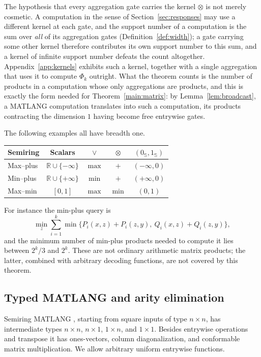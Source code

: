 The hypothesis that every aggregation gate carries the kernel $\otimes$ is
not merely cosmetic. A computation in the sense of
Section~\ref{sec:responses} may use a different kernel at each gate, and the
support number of a computation is the sum over \emph{all} of its
aggregation gates (Definition~\ref{def:width}); a gate carrying some other
kernel therefore contributes its own support number to this sum, and a
kernel of infinite support number defeats the count altogether.
Appendix~\ref{app:kernels} exhibits such a kernel, together with a single
aggregation that uses it to compute $\Phi_k$ outright. What the
theorem counts is the number of products in a computation whose only
aggregations are products, and this is exactly the form needed for
Theorem~\ref{main:matrix}: by Lemma~\ref{lem:broadcast}, a MATLANG
computation translates into such a computation, its products contracting
the dimension $1$ having become free entrywise gates.

The following examples all have breadth one.
\begin{center}
\renewcommand{\arraystretch}{1.2}
\begin{tabular}{lcccc}
\toprule
Semiring & Scalars & $\vee$ & $\otimes$ & $(0_{\mathbb S},1_{\mathbb S})$\\
\midrule
Max--plus & $\mathbb R\cup\{-\infty\}$ & $\max$ & $+$ & $(-\infty,0)$\\
Min--plus & $\mathbb R\cup\{+\infty\}$ & $\min$ & $+$ & $(+\infty,0)$\\
Max--min & $[0,1]$ & $\max$ & $\min$ & $(0,1)$\\
\bottomrule
\end{tabular}
\end{center}
For instance the min-plus query is
\[
 \min_z\sum_{i=1}^k
 \min\{P_i(x,z)+P_i(z,y),\ Q_i(x,z)+Q_i(z,y)\},
\]
and the minimum number of min-plus products needed to compute it lies
between $2^k/3$ and $2^k$. These are not ordinary arithmetic matrix
products; the latter, combined with arbitrary decoding functions, are not
covered by this theorem.

\subsection{Typed MATLANG and arity elimination}\label{semi:typed-section}
Semiring MATLANG \citep{brijder2022}, starting from square inputs of type
$n\times n$, has intermediate types $n\times n$, $n\times1$, $1\times n$,
and $1\times1$. Besides entrywise operations and transpose it has
ones-vectors, column diagonalization, and conformable matrix
multiplication. We allow arbitrary uniform entrywise functions.

